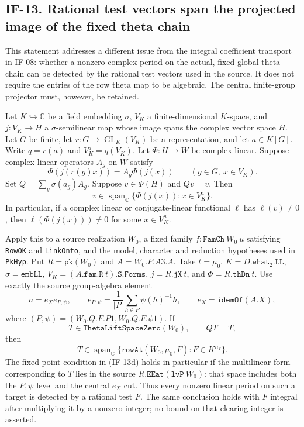 \subsection*{IF-13. Rational test vectors span the projected image of the fixed theta chain}

This statement addresses a different issue from the integral
coefficient transport in IF-08: whether a nonzero complex period on
the actual, fixed global theta chain can be detected by the rational
test vectors used in the source. It does not require the entries of
the row theta map to be algebraic. The central finite-group projector
must, however, be retained.

\begin{proposition}
Let $K\hookrightarrow\mathbb C$ be a field embedding $\sigma$,
$V_K$ a finite-dimensional $K$-space, and
$j:V_K\longrightarrow H$ a $\sigma$-semilinear map whose image
spans the complex vector space $H$. Let $G$ be finite, let
$r:G\longrightarrow\operatorname{GL}_K(V_K)$ be a representation,
and let $a\in K[G]$. Write $q=r(a)$ and
$V_K^a=q(V_K)$. Let $\Phi:H\longrightarrow W$ be complex linear.
Suppose complex-linear operators $A_g$ on $W$ satisfy
\[
       \Phi(j(r(g)x))=A_g\Phi(j(x))
       \qquad(g\in G,\ x\in V_K).                         \tag{IF-13a}
\]
Set $Q=\sum_g\sigma(a_g)A_g$. Suppose $v\in\Phi(H)$ and $Qv=v$.
Then
\[
 v\in\operatorname{span}_{\mathbb C}
       \{\Phi(j(x)):x\in V_K^a\}.                         \tag{IF-13b}
\]
In particular, if a complex linear or conjugate-linear functional
$\ell$ has $\ell(v)\ne0$, then $\ell(\Phi(j(x)))\ne0$ for
some $x\in V_K^a$.

Apply this to a source realization $W_0$, a fixed family
$f:\texttt{FamCh}\ W_0\ u$ satisfying \texttt{RowOK} and
\texttt{LinkOnto}, and the model, character and reduction hypotheses
used in \texttt{PkHyp}. Put $R=\texttt{pk}(W_0)$ and
$A=W_0.P.A3.A$. Take $t=\mu_0$,
$K=D.\texttt{what}_2.\texttt{LL}$, $\sigma=\texttt{embLL}$,
$V_K=(A.\texttt{fam.R}\ t).\texttt{S.Forms}$,
$j=R.\texttt{jX}\ t$, and $\Phi=R.\texttt{thDn}\ t$.
Use exactly the source group-algebra element
\[
 a=e_X e_{P,\psi},\qquad
 e_{P,\psi}=\frac1{|P|}\sum_{h\in P}\psi(h)^{-1}h,
 \qquad
 e_X=\texttt{idemOf}(A.X),                                \tag{IF-13c}
\]
where $(P,\psi)=(W_0.Q.F.P1,W_0.Q.F.\psi1)$.
If
\[
 T\in\texttt{ThetaLiftSpaceZero}(W_0),\qquad
             QT=T,                                      \tag{IF-13d}
\]
then
\[
 T\in\operatorname{span}_{\mathbb C}
     \{\texttt{rowAt}(W_0,\mu_0,F):F\in K^{n_V}\}.
                                                            \tag{IF-13e}
\]
The fixed-point condition in (IF-13d) holds in particular if the
multilinear form corresponding to $T$ lies in the source
$R.\texttt{EEat}(\texttt{lvP}\ W_0)$: that space includes both
the $P,\psi$ level and the central $e_X$ cut. Thus every nonzero
linear period on such a target is detected by a rational test $F$.
The same conclusion holds with $F$ integral after multiplying it
by a nonzero integer; no bound on that clearing integer is asserted.
\end{proposition}

